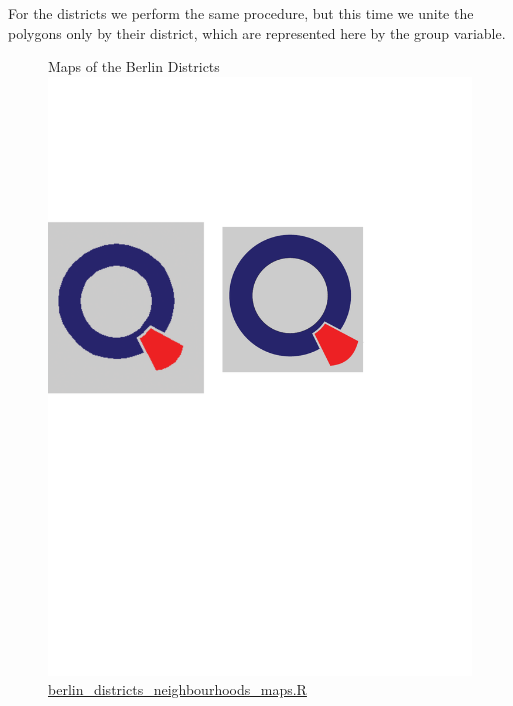 For the districts we perform the same procedure, but this time we unite the polygons only by their district, which are represented here by the group variable.


\begin{figure}[H]
\centering
{}
\caption{Maps of the Berlin Districts \protect\includegraphics[scale=0.05]{qletlogo.pdf} {\href{https://github.com/silvia-ventoruzzo/SPL-WISE-2018/blob/master/Berlin_Districts_Neighbourhoods/berlin_districts_neighbourhoods_maps.R}{berlin\_districts\_neighbourhoods\_maps.R}}}

\end{figure}

